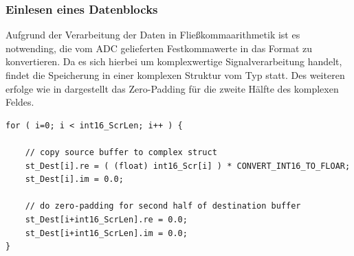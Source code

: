 \subsubsection{Einlesen eines Datenblocks}
Aufgrund der Verarbeitung der Daten in Fließkommaarithmetik ist es notwending, die vom ADC gelieferten Festkommawerte in das Format  zu konvertieren. Da es sich hierbei um komplexwertige Signalverarbeitung handelt, findet die Speicherung in einer komplexen Struktur vom Typ  statt. Des weiteren erfolge wie in  dargestellt das Zero-Padding für die zweite Hälfte des komplexen Feldes.


\pagebreak

\begin{lstlisting}[caption={Einlesen eines Datenblocks vom ADC inkl. Zero-Padding}, label=lst:copy2cmpxStr,frame=htlrb, firstnumber=1]  
for ( i=0; i < int16_ScrLen; i++ ) {
    
    // copy source buffer to complex struct
    st_Dest[i].re = ( (float) int16_Scr[i] ) * CONVERT_INT16_TO_FLOAR;
    st_Dest[i].im = 0.0;
    
    // do zero-padding for second half of destination buffer
    st_Dest[i+int16_ScrLen].re = 0.0;
    st_Dest[i+int16_ScrLen].im = 0.0;
}
\end{lstlisting}






